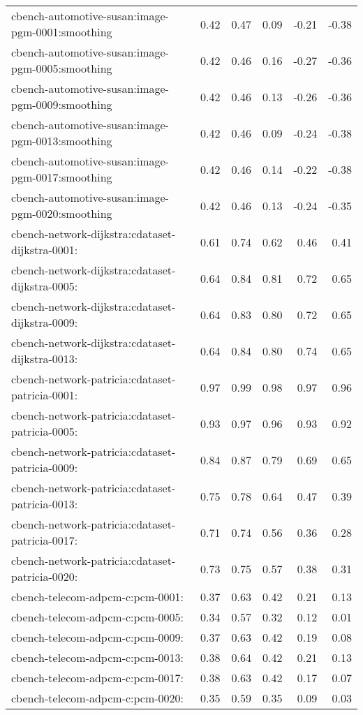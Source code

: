 \begin{table}
\begin{tabular}{lrrrrr}
cbench-automotive-susan:image-pgm-0001:smoothing & 0.42 & 0.47 & 0.09 & -0.21 & -0.38 \\
cbench-automotive-susan:image-pgm-0005:smoothing & 0.42 & 0.46 & 0.16 & -0.27 & -0.36 \\
cbench-automotive-susan:image-pgm-0009:smoothing & 0.42 & 0.46 & 0.13 & -0.26 & -0.36 \\
cbench-automotive-susan:image-pgm-0013:smoothing & 0.42 & 0.46 & 0.09 & -0.24 & -0.38 \\
cbench-automotive-susan:image-pgm-0017:smoothing & 0.42 & 0.46 & 0.14 & -0.22 & -0.38 \\
cbench-automotive-susan:image-pgm-0020:smoothing & 0.42 & 0.46 & 0.13 & -0.24 & -0.35 \\
cbench-network-dijkstra:cdataset-dijkstra-0001: & 0.61 & 0.74 & 0.62 & 0.46 & 0.41 \\
cbench-network-dijkstra:cdataset-dijkstra-0005: & 0.64 & 0.84 & 0.81 & 0.72 & 0.65 \\
cbench-network-dijkstra:cdataset-dijkstra-0009: & 0.64 & 0.83 & 0.80 & 0.72 & 0.65 \\
cbench-network-dijkstra:cdataset-dijkstra-0013: & 0.64 & 0.84 & 0.80 & 0.74 & 0.65 \\
cbench-network-patricia:cdataset-patricia-0001: & 0.97 & 0.99 & 0.98 & 0.97 & 0.96 \\
cbench-network-patricia:cdataset-patricia-0005: & 0.93 & 0.97 & 0.96 & 0.93 & 0.92 \\
cbench-network-patricia:cdataset-patricia-0009: & 0.84 & 0.87 & 0.79 & 0.69 & 0.65 \\
cbench-network-patricia:cdataset-patricia-0013: & 0.75 & 0.78 & 0.64 & 0.47 & 0.39 \\
cbench-network-patricia:cdataset-patricia-0017: & 0.71 & 0.74 & 0.56 & 0.36 & 0.28 \\
cbench-network-patricia:cdataset-patricia-0020: & 0.73 & 0.75 & 0.57 & 0.38 & 0.31 \\
cbench-telecom-adpcm-c:pcm-0001: & 0.37 & 0.63 & 0.42 & 0.21 & 0.13 \\
cbench-telecom-adpcm-c:pcm-0005: & 0.34 & 0.57 & 0.32 & 0.12 & 0.01 \\
cbench-telecom-adpcm-c:pcm-0009: & 0.37 & 0.63 & 0.42 & 0.19 & 0.08 \\
cbench-telecom-adpcm-c:pcm-0013: & 0.38 & 0.64 & 0.42 & 0.21 & 0.13 \\
cbench-telecom-adpcm-c:pcm-0017: & 0.38 & 0.63 & 0.42 & 0.17 & 0.07 \\
cbench-telecom-adpcm-c:pcm-0020: & 0.35 & 0.59 & 0.35 & 0.09 & 0.03 \\

\end{tabular}
\end{table}
